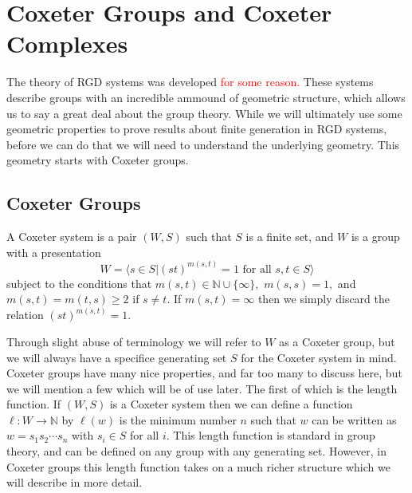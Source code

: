 \documentclass[class=book, crop=false,12 pt]{standalone}
\begin{document}
\chapter{Coxeter Groups and Coxeter Complexes}
\label{ch:coxeter}
The theory of RGD systems was developed \textcolor{red}{for some reason.} These systems describe groups with an incredible ammound of geometric structure, which allows us to say a great deal about the group theory. While we will ultimately use some geometric properties to prove results about finite generation in RGD systems, before we can do that we will need to understand the underlying geometry. This geometry starts with Coxeter groups.

\section{Coxeter Groups}
\label{sec:coxgrp}
\begin{defn}
	\label{def:coxgrp}
	A Coxeter system is a pair $(W,S)$ such that $S$ is a finite set, and $W$ is a group with a presentation
	\[
		W=\langle s\in S|(st)^{m(s,t)}=1\text{ for all }s,t\in S\rangle
	\]
	subject to the conditions that $m(s,t)\in \mathbb{N}\cup \{\infty\},$ $m(s,s)=1,$ and $m(s,t)=m(t,s)\ge 2$ if $s\neq t.$ If $m(s,t)=\infty$ then we simply discard the relation $(st)^{m(s,t)}=1.$
\end{defn}

Through slight abuse of terminology we will refer to $W$ as a Coxeter group, but we will always have a specifice generating set $S$ for the Coxeter system in mind. Coxeter groups have many nice properties, and far too many to discuss here, but we will mention a few which will be of use later. The first of which is the length function. If $(W,S)$ is a Coxeter system then we can define a function $\ell:W\to \mathbb{N}$ by $\ell(w)$ is the minimum number $n$ such that $w$ can be written as $w=s_1s_2\cdots s_n$ with $s_i\in S$ for all $i.$ This length function is standard in group theory, and can be defined on any group with any generating set. However, in Coxeter groups this length function takes on a much richer structure which we will describe in more detail.
\end{document}

